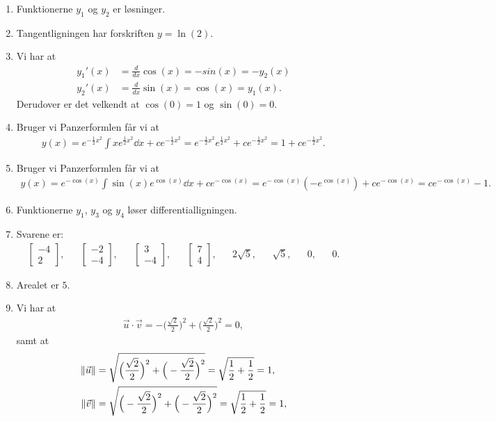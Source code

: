 \begin{enumerate}
	\item Funktionerne $y_1$ og $y_2$ er løsninger.
	
	\item Tangentligningen har forskriften $y=\ln(2)$.
	
	\item Vi har at
	\begin{align*}
	y_1'(x)&=\frac{d}{dx}\cos(x)=-sin(x)=-y_2(x)\\
	y_2'(x)&=\frac{d}{dx}\sin(x)=\cos(x)=y_1(x).
	\end{align*}
	Derudover er det velkendt at  $\cos(0)=1$ og $\sin(0)=0$. 
	
	\item Bruger vi Panzerformlen får vi at
	\begin{align*}
	y(x)=e^{-\frac{1}{2}x^2}\int xe^{\frac{1}{2}x^2}\dd x +ce^{-\frac{1}{2}x^2}=e^{-\frac{1}{2}x^2}e^{\frac{1}{2}x^2}+ce^{-\frac{1}{2}x^2}=1+ce^{-\frac{1}{2}x^2}.
	\end{align*}

	
	\item Bruger vi Panzerformlen får vi at
	\begin{align*}
	y(x)=e^{-\cos(x)}\int \sin(x)e^{\cos(x)}\dd x+ce^{-\cos(x)}=e^{-\cos(x)}(-e^{\cos(x)})+ce^{-\cos(x)}=ce^{-\cos(x)}-1.
	\end{align*}
	
	\item Funktionerne $y_1$, $y_3$ og $y_4$ løser differentialligningen.
	
	\item Svarene er:
	\begin{align*}
	\begin{bmatrix}
	-4\\2
	\end{bmatrix},&&\begin{bmatrix}
	-2\\-4
	\end{bmatrix},&&\begin{bmatrix}
	3\\-4
	\end{bmatrix},&&\begin{bmatrix}
	7\\4
	\end{bmatrix},&&2\sqrt{5},&&\sqrt{5},&&0,&& 0.
	\end{align*}
	
	\item Arealet er $5$.
	
		
	\item Vi har at
	\begin{align*}
	\vec{u}\cdot \vec{v}=-\Big(\frac{\sqrt{2}}{2}\Big)^2+\Big(\frac{\sqrt{2}}{2}\Big)^2=0,
	\end{align*}
	samt at
	\begin{align*}
	\Vert \vec{u}\Vert&=\sqrt{\Big(\frac{\sqrt{2}}{2}\Big)^2+\Big(-\frac{\sqrt{2}}{2}\Big)^2}=\sqrt{\frac{1}{2}+\frac{1}{2}}=1,\\
	\Vert \vec{v}\Vert&=\sqrt{\Big(-\frac{\sqrt{2}}{2}\Big)^2+\Big(-\frac{\sqrt{2}}{2}\Big)^2}=\sqrt{\frac{1}{2}+\frac{1}{2}}=1,
	\end{align*}
	

\end{enumerate}

